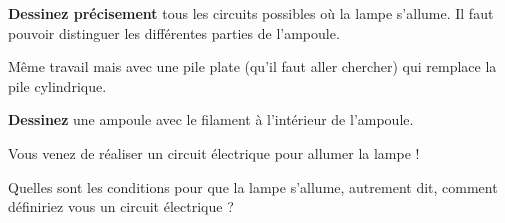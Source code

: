 \documentclass[11pt]{article}
\begin{document}
\begin{question}



\begin{subquestion}{
	\textbf{Dessinez précisement} tous les circuits possibles où la lampe s’allume.
	Il faut pouvoir distinguer les différentes parties de l'ampoule. 
	} %

\end{subquestion}


\begin{subquestion}{
	Même travail mais avec une pile plate (qu'il faut aller chercher) 
	qui remplace la pile cylindrique.
	} 
\end{subquestion}

\begin{subquestion}{
	\textbf{Dessinez} une ampoule avec le filament à l’intérieur de l’ampoule.
	} 
\end{subquestion}
Vous venez de réaliser un circuit électrique pour allumer la lampe !
\begin{subquestion}{
	Quelles sont les conditions pour que la lampe s’allume, autrement dit,
	comment définiriez vous un circuit électrique ?	
	} 

\end{subquestion}

\end{question}
\end{document}
